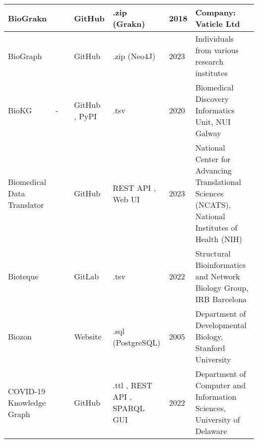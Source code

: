 \documentclass{article}
\begin{document}
\begin{landscape}
\begin{xltabular}{\textwidth}{p{3cm}|p{2.2cm}|p{2.2cm}|p{2.2cm}|p{2.2cm}|p{1cm}|p{6cm}}
\hline


BioGrakn
&
\cite{biograkn_website}
&
\cite{biograkn_publication}
&
GitHub
\cite{biograkn_github}
&
.zip (Grakn)
\cite{biograkn_data}
&
2018
&
Company: Vaticle Ltd
\cite{biograkn_group}
\\


\hline


BioGraph
&
\cite{biograph_website}
&
\cite{biograph_publication}
&
GitHub
\cite{biograph_github}
&
.zip (Neo4J)
\cite{biograph_data}
&
2023
&
Individuals from various research institutes
\\


\hline


BioKG
&
-
&
\cite{biokg_publication}
&
GitHub
\cite{biokg_github1}
\cite{biokg_github2},
PyPI
\cite{biokg_pypi}
&
.tsv
\cite{biokg_data}
&
2020
&
Biomedical Discovery Informatics Unit, NUI Galway
\cite{biokg_group1}
\cite{biokg_group2}
\\


\hline


Biomedical Data Translator
&
\cite{bdt_website1}
\cite{bdt_website2}
&
\cite{bdt_publication1}
\cite{bdt_publication2}
&
GitHub
\cite{bdt_github1}
\cite{bdt_github2}
\cite{bdt_github3}
&
REST API
\cite{bdt_data1},
Web UI
\cite{bdt_data2}
&
2023
&
National Center for Advancing Translational Sciences (NCATS), National Institutes of Health (NIH)
\cite{bdt_group}
\\


\hline


Bioteque
&
\cite{bioteque_website}
&
\cite{bioteque_publication1}
\cite{bioteque_publication2}
&
GitLab
\cite{bioteque_gitlab}
&
.tsv
\cite{bioteque_data}
&
2022
&
Structural Bioinformatics and Network Biology Group, IRB Barcelona
\cite{bioteque_group}
\\


\hline


Biozon
&
\cite{biozon_website}
&
\cite{biozon_publication1}
\cite{biozon_publication2}
&
Website
\cite{biozon_software_and_data}
&
.sql (PostgreSQL)
\cite{biozon_software_and_data}
&
2005
&
Department of Developmental Biology, Stanford University
\cite{biozon_group}
\\


\hline


COVID-19 Knowledge Graph
&
\cite{covid19kg_website}
&
\cite{covid19kg_publication}
&
GitHub
\cite{covid19kg_github}
&
.ttl
\cite{covid19kg_data1},
REST API
\cite{covid19kg_data2},
SPARQL GUI
\cite{covid19kg_data3}
&
2022
&
Department of Computer and Information Sciences, University of Delaware
\cite{covid19kg_group}
\\



\end{xltabular}
\end{landscape}
\end{document}
